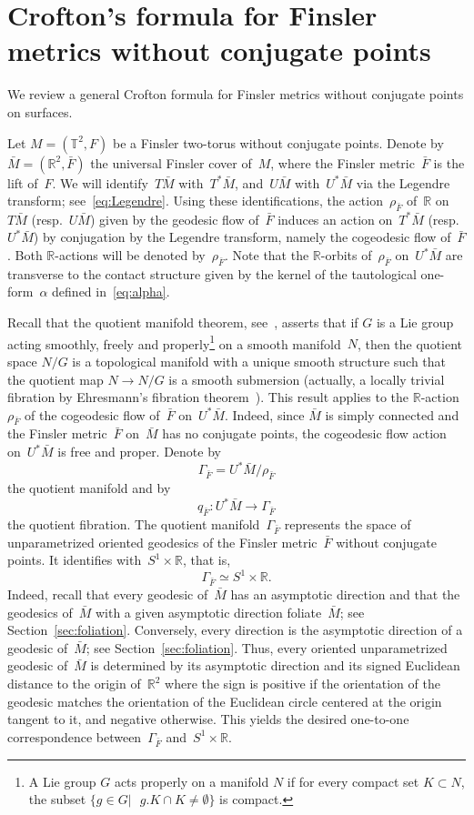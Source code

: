 \documentclass[AHL,Unicode,longabstracts,published]{cedram}
\newcommand{\R}{\mathbb{R}}
\newcommand{\T}{\mathbb{T}}
\begin{document}
\section{Crofton's formula for Finsler metrics without conjugate points} \label{sec:crofton}

We review a general Crofton formula for Finsler metrics without conjugate points on surfaces.


Let $M=(\T^2,F)$ be a Finsler two-torus without conjugate points. Denote by~$\bar{M}=(\R^2,\bar{F})$ the universal Finsler cover of~$M$, where the Finsler metric~$\bar{F}$ is the lift of~$F$. We will identify~$T\bar{M}$ with~$T^{*}\bar{M}$, and~$U\bar{M}$ with~$U^{*}\bar{M}$ via the Legendre transform; see~\eqref{eq:Legendre}. Using these identifications, the action~$\rho_{\bar{F}}$ of~$\R$ on~$T\bar{M}$ (resp.~$U\bar{M}$) given by the geodesic flow of~$\bar{F}$ induces an action on~$T^*\bar{M}$ (resp.~$U^{*}\bar{M}$) by conjugation by the Legendre transform, namely the cogeodesic flow of~$\bar{F}$. Both $\R$-actions will be denoted by~$\rho_{\bar{F}}$. Note that the $\R$-orbits of~$\rho_{\bar{F}}$ on~$U^{*}\bar{M}$ are transverse to the contact structure given by the kernel of the tautological one-form~$\alpha$ defined in~\eqref{eq:alpha}.


Recall that the quotient manifold theorem, see~\cite[Theorem~7.10]{lee}, asserts that if $G$ is a Lie group acting smoothly, freely and properly\footnote{A Lie group $G$ acts properly on a manifold $N$ if for every compact set $K\subset N$, the subset $\{g\in G| \mbox{ }g.K\cap K\neq\emptyset\}$ is compact.} on a smooth manifold~$N$, then the quotient space $N/G$ is a topological manifold with a unique smooth structure such that the quotient map $N \to N/G$ is a smooth submersion (actually, a locally trivial fibration by Ehresmann's fibration theorem~\cite{ehresmann}). This result applies to the $\R$-action~$\rho_{\bar{F}}$ of the cogeodesic flow of~$\bar{F}$ on~$U^* \bar{M}$. Indeed, since $\bar{M}$ is simply connected and the Finsler metric~$\bar{F}$ on~$\bar{M}$ has no conjugate points, the cogeodesic flow action on~$U^* \bar{M}$ is free and proper. Denote by
\[
\Gamma_{\bar{F}}=U^* \bar{M}/\rho_{\bar{F}}
\]
the quotient manifold and by
\[
q_{\bar{F}}:U^* \bar{M} \to \Gamma_{\bar{F}}
\]
the quotient fibration. The quotient manifold~$\Gamma_{\bar{F}}$ represents the space of unparametri\-zed oriented geodesics of the Finsler metric~$\bar{F}$ without conjugate points. It identifies with~$S^1 \times \R$, that is,
\[
\Gamma_{\bar{F}} \simeq S^1 \times \R.
\]
Indeed, recall that every geodesic of~$\bar{M}$ has an asymptotic direction and that the geodesics of~$\bar{M}$ with a given asymptotic direction foliate~$\bar{M}$; see Section~\ref{sec:foliation}. Conversely, every direction is the asymptotic direction of a geodesic of~$\bar{M}$; see Section~\ref{sec:foliation}. Thus, every oriented unparametrized geodesic of~$\bar{M}$ is determined by its asymptotic direction and its signed Euclidean distance to the origin of~$\R^2$ where the sign is positive if the orientation of the geodesic matches the orientation of the Euclidean circle centered at the origin tangent to it, and negative otherwise. This yields the desired one-to-one correspondence between~$\Gamma_{\bar{F}}$ and~$S^1 \times \R$.
\end{document}
